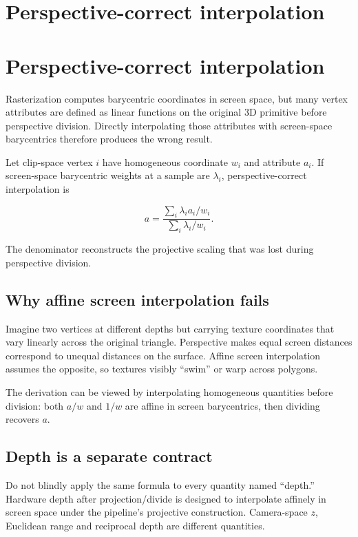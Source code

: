 \hypertarget{appendix-1ed5f96c73ea}{}
\section*{Perspective-correct interpolation}
\section{Perspective-correct interpolation}\label{appendix-1ed5f96c73ea-perspective-correct-interpolation}

Rasterization computes barycentric coordinates in screen space, but many vertex attributes are defined as linear functions on the original 3D primitive before perspective division. Directly interpolating those attributes with screen-space barycentrics therefore produces the wrong result.

Let clip-space vertex \(i\) have homogeneous coordinate \(w_i\) and attribute \(a_i\). If screen-space barycentric weights at a sample are \(\lambda_i\), perspective-correct interpolation is

\[
a=
\frac{
\sum_i \lambda_i a_i/w_i
}{
\sum_i \lambda_i /w_i
}.
\]

The denominator reconstructs the projective scaling that was lost during perspective division.

\subsection{Why affine screen interpolation fails}\label{appendix-1ed5f96c73ea-why-affine-screen-interpolation-fails}

Imagine two vertices at different depths but carrying texture coordinates that vary linearly across the original triangle. Perspective makes equal screen distances correspond to unequal distances on the surface. Affine screen interpolation assumes the opposite, so textures visibly ``swim'' or warp across polygons.

The derivation can be viewed by interpolating homogeneous quantities before division: both \(a/w\) and \(1/w\) are affine in screen barycentrics, then dividing recovers \(a\).

\subsection{Depth is a separate contract}\label{appendix-1ed5f96c73ea-depth-is-a-separate-contract}

Do not blindly apply the same formula to every quantity named ``depth.'' Hardware depth after projection/divide is designed to interpolate affinely in screen space under the pipeline's projective construction. Camera-space \(z\), Euclidean range and reciprocal depth are different quantities.

